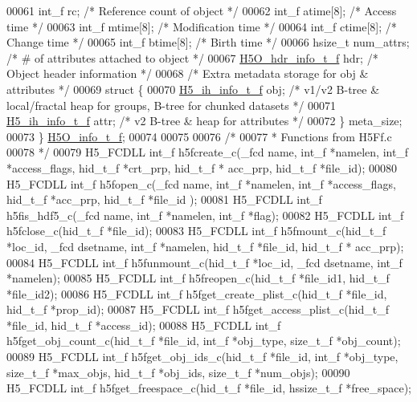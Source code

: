 \begin{DoxyCode}
00061     int\_f       rc;     \textcolor{comment}{/* Reference count of object    */}
00062     int\_f           atime[8];   \textcolor{comment}{/* Access time          */}
00063     int\_f       mtime[8];   \textcolor{comment}{/* Modification time        */}
00064     int\_f       ctime[8];   \textcolor{comment}{/* Change time          */}
00065     int\_f       btime[8];   \textcolor{comment}{/* Birth time           */}
00066     hsize\_t         num\_attrs;  \textcolor{comment}{/* # of attributes attached to object */}
00067     \hyperlink{struct_h5_o__hdr__info__t__f}{H5O\_hdr\_info\_t\_f}    hdr;            \textcolor{comment}{/* Object header information */}
00068     \textcolor{comment}{/* Extra metadata storage for obj & attributes */}
00069     \textcolor{keyword}{struct }\{
00070         \hyperlink{struct_h5__ih__info__t__f}{H5\_ih\_info\_t\_f}   obj;             \textcolor{comment}{/* v1/v2 B-tree & local/fractal heap for groups,
       B-tree for chunked datasets */}
00071         \hyperlink{struct_h5__ih__info__t__f}{H5\_ih\_info\_t\_f}   attr;            \textcolor{comment}{/* v2 B-tree & heap for attributes */}
00072     \} meta\_size;
00073 \} \hyperlink{struct_h5_o__info__t__f}{H5O\_info\_t\_f};
00074 
00075 
00076 \textcolor{comment}{/*}
00077 \textcolor{comment}{ *  Functions from H5Ff.c}
00078 \textcolor{comment}{ */}
00079 H5\_FCDLL int\_f h5fcreate\_c(\_fcd name, int\_f *namelen, int\_f *access\_flags, hid\_t\_f *crt\_prp, hid\_t\_f *
      acc\_prp, hid\_t\_f *file\_id);
00080 H5\_FCDLL int\_f h5fopen\_c(\_fcd name, int\_f *namelen, int\_f *access\_flags, hid\_t\_f *acc\_prp, hid\_t\_f *file\_id
      );
00081 H5\_FCDLL int\_f h5fis\_hdf5\_c(\_fcd name, int\_f *namelen, int\_f *flag);
00082 H5\_FCDLL int\_f h5fclose\_c(hid\_t\_f *file\_id);
00083 H5\_FCDLL int\_f h5fmount\_c(hid\_t\_f *loc\_id, \_fcd dsetname, int\_f *namelen, hid\_t\_f *file\_id, hid\_t\_f *
      acc\_prp);
00084 H5\_FCDLL int\_f h5funmount\_c(hid\_t\_f *loc\_id, \_fcd dsetname, int\_f *namelen);
00085 H5\_FCDLL int\_f h5freopen\_c(hid\_t\_f *file\_id1, hid\_t\_f *file\_id2);
00086 H5\_FCDLL int\_f h5fget\_create\_plist\_c(hid\_t\_f *file\_id, hid\_t\_f *prop\_id);
00087 H5\_FCDLL int\_f h5fget\_access\_plist\_c(hid\_t\_f *file\_id, hid\_t\_f *access\_id);
00088 H5\_FCDLL int\_f h5fget\_obj\_count\_c(hid\_t\_f *file\_id, int\_f *obj\_type, size\_t\_f *obj\_count);
00089 H5\_FCDLL int\_f h5fget\_obj\_ids\_c(hid\_t\_f *file\_id, int\_f *obj\_type, size\_t\_f *max\_objs, hid\_t\_f *obj\_ids, 
      size\_t\_f *num\_objs);
00090 H5\_FCDLL int\_f h5fget\_freespace\_c(hid\_t\_f *file\_id, hssize\_t\_f *free\_space);

\end{DoxyCode}
